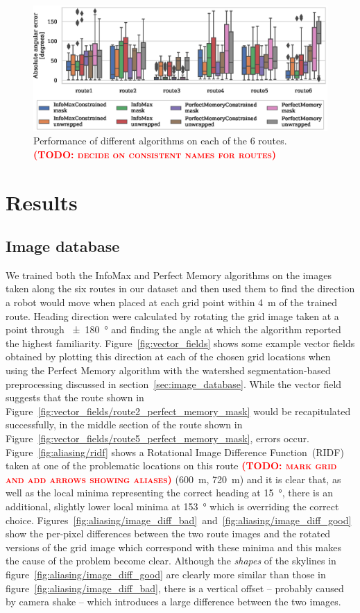 \documentclass[letterpaper]{article}
\newcommand{\todo}[1]{\textbf{\textsc{\textcolor{red}{(TODO: #1)}}}}
\begin{document}
\begin{figure}[t]
    \centering
    \includegraphics{figures/route_benchmark.eps}
    \caption{Performance of different algorithms on each of the 6 routes. \todo{decide on consistent names for routes}}
    \label{fig:route_benchmark}
\end{figure}

\section{Results}
\subsection{Image database}
We trained both the InfoMax and Perfect Memory algorithms on the images taken along the six routes in our dataset and then used them to find the direction a robot would move when placed at each grid point within \SI{4}{\metre} of the trained route. 
Heading direction were calculated by rotating the grid image taken at a point through \SI{\pm 180}{\degree} and finding the angle at which the algorithm reported the highest familiarity.
Figure~\ref{fig:vector_fields} shows some example vector fields obtained by plotting this direction at each of the chosen grid locations when using the Perfect Memory algorithm with the watershed segmentation-based preprocessing discussed in section~\ref{sec:image_database}. 
While the vector field suggests that the route shown in Figure~\ref{fig:vector_fields/route2_perfect_memory_mask} would be recapitulated successfully, in the middle section of the route shown in Figure~\ref{fig:vector_fields/route5_perfect_memory_mask}, errors occur.
Figure~\ref{fig:aliasing/ridf} shows a Rotational Image Difference Function~(RIDF) taken at one of the problematic locations on this route \todo{mark grid and add arrows showing aliases} (\SI{600}{\metre}, \SI{720}{\metre}) and it is clear that, as well as the local minima representing the correct heading at \SI{15}{\degree}, there is an additional, slightly lower local minima at \SI{153}{\degree} which is overriding the correct choice.
Figures~\ref{fig:aliasing/image_diff_bad}~and~\ref{fig:aliasing/image_diff_good} show the per-pixel differences between the two route images and the rotated versions of the grid image which correspond with these minima and this makes the cause of the problem become clear.
Although the \emph{shapes} of the skylines in figure~\ref{fig:aliasing/image_diff_good} are clearly more similar than those in figure~\ref{fig:aliasing/image_diff_bad}, there is a vertical offset -- probably caused by camera shake -- which introduces a large difference between the two images.
\end{document}
